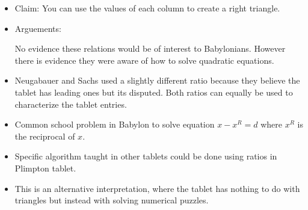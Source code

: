 \documentclass{report}
\begin{document}
\begin{itemize}
    \item Claim: You can use the values of each column to create
        a right triangle.
    \item Arguements:
        \begin{mdframed}
            No evidence these relations would be of interest
            to Babylonians. However there is evidence
            they were aware of how to solve quadratic equations.
        \end{mdframed}
    \item Neugabauer and Sachs used a slightly different ratio
        because they believe the tablet has leading ones
        but its disputed. Both ratios can equally be used
        to characterize the tablet entries.
    \item Common school problem in Babylon to solve equation
        $x - x^R = d$ where  $x^R$ is the reciprocal of
         $x$.
     \item Specific algorithm taught in other tablets
         could be done using ratios in Plimpton tablet.
     \item This is an alternative interpretation, where
         the tablet has nothing to do with triangles but instead
         with solving numerical puzzles.
\end{itemize}
\end{document}
